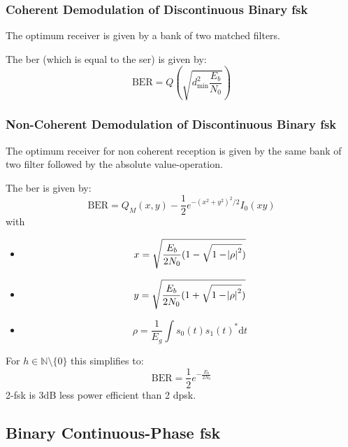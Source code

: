 \subsubsection{Coherent Demodulation of Discontinuous Binary \acl{fsk}}
The optimum receiver is given by a bank of two matched filters.

The \ac{ber} (which is equal to the \ac{ser}) is given by:
\begin{equation}
    \text{BER} = Q\left(\sqrt{d_\text{min}^2 \frac{E_b}{N_0}}\right)
\end{equation}
    
\subsubsection{Non-Coherent Demodulation of Discontinuous Binary \acl{fsk}}
The optimum receiver for non coherent reception is given by the same bank of two
filter followed by the absolute value-operation.

The \ac{ber} is given by:
\begin{equation}
    \text{BER} = Q_M(x, y) - \frac{1}{2} e^{-{(x^2 + y^2)}^2 / 2} I_0(xy)
\end{equation}
with
\begin{itemize}
    \item 
        \begin{equation}
            x = \sqrt{\frac{E_b}{2 N_0} (1-\sqrt{1 - \abs{\rho}^2})}
        \end{equation}
    \item
        \begin{equation}
            y = \sqrt{\frac{E_b}{2 N_0} (1+\sqrt{1 - \abs{\rho}^2})}
        \end{equation}
    \item
        \begin{equation}
            \rho = \frac{1}{E_g} \int s_0(t) s_1(t)^* \text{d}t
        \end{equation}
\end{itemize}

For $h \in \mathbb{N}\setminus \{0\}$ this simplifies to:
\begin{equation}
    \text{BER} = \frac{1}{2} e^{-\frac{E_b}{2 N_0}}
\end{equation}
2-\ac{fsk} is 3dB less power efficient than 2 \ac{dpsk}.

\subsection{Binary Continuous-Phase \acl{fsk}}
